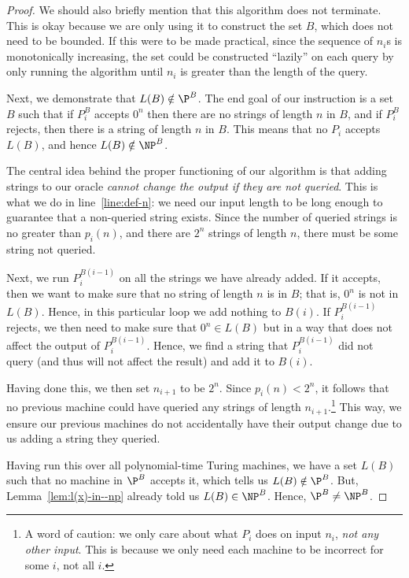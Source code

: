\documentclass{reedthesis}
\theoremstyle{plain}
\theoremstyle{definition}
\theoremstyle{remark}
\numberwithin{equation}{section}
\begin{document}
\begin{proof}
  We should also briefly mention that this algorithm does not terminate. This is
  okay because we are only using it to construct the set $B$, which does not
  need to be bounded. If this were to be made practical, since the sequence of
  $n_{i}$s is monotonically increasing, the set could be constructed ``lazily''
  on each query by only running the algorithm until $n_{i}$ is greater than the
  length of the query.

  Next, we demonstrate that $L(B) \notin \P^{B}$. The end goal of our instruction is
  a set $B$ such that if $P_{i}^{B}$ accepts $0^{n}$ then there are no strings
  of length $n$ in $B$, and if $P_{i}^{B}$ rejects, then there is a string of
  length $n$ in $B$. This means that no $P_{i}$ accepts $L(B)$, and hence
  $L(B) \notin \NP^{B}$.

  The central idea behind the proper functioning of our algorithm is that adding
  strings to our oracle \emph{cannot change the output if they are not queried}.
  This is what we do in line~\ref{line:def-n}: we need our input length to be
  long enough to guarantee that a non-queried string exists. Since the number of
  queried strings is no greater than $p_{i}(n)$, and there are $2^{n}$ strings
  of length $n$, there must be some string not queried.

  Next, we run $P_{i}^{B(i-1)}$ on all the strings we have already added. If it
  accepts, then we want to make sure that no string of length $n$ is in $B$;
  that is, $0^{n}$ is not in $L(B)$. Hence, in this particular loop we add
  nothing to $B(i)$. If $P_{i}^{B(i-1)}$ rejects, we then need to make sure that
  $0^{n} \in L(B)$ but in a way that does not affect the output of
  $P_{i}^{B(i-1)}$. Hence, we find a string that $P_{i}^{B(i-1)}$ did not query
  (and thus will not affect the result) and add it to $B(i)$.

  Having done this, we then set $n_{i+1}$ to be $2^{n}$. Since
  $p_{i}(n) < 2^{n}$, it follows that no previous machine could have queried any
  strings of length $n_{i+1}$.\footnote{A word of caution: we only care about
    what $P_{i}$ does on input $n_{i}$, \emph{not any other input}. This is
    because we only need each machine to be incorrect for some $i$, not all
    $i$.} This way, we ensure our previous machines do not accidentally have
  their output change due to us adding a string they queried.

  Having run this over all polynomial-time Turing machines, we have a set $L(B)$
  such that no machine in $\P^{B}$ accepts it, which tells us $L(B) \notin \P^{B}$.
  But, Lemma~\ref{lem:l(x)-in--np} already told us $L(B) \in \NP^{B}$. Hence,
  $\P^{B} \ne \NP^{B}$.
\end{proof}
\end{document}
